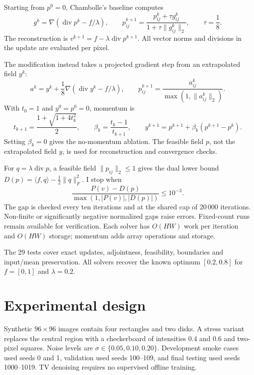 \documentclass[10pt,a4paper]{article}
\begin{document}
Starting from $p^0=0$, Chambolle's baseline computes
\begin{equation}
 g^k=\nabla\!\left(\operatorname{div}p^k-f/\lambda\right),
 \qquad
 p^{k+1}_{ij}=
 \frac{p^k_{ij}+\tau g^k_{ij}}
      {1+\tau\|g^k_{ij}\|_2},
 \qquad \tau=\frac18.
 \label{eq:baseline}
\end{equation}
The reconstruction is $v^{k+1}=f-\lambda\operatorname{div}p^{k+1}$.
All vector norms and divisions in the update are evaluated per pixel.

The modification instead takes a projected gradient step from an
extrapolated field $y^k$:
\begin{equation}
 a^k=y^k+\frac18\nabla\!\left(\operatorname{div}y^k-f/\lambda\right),
 \qquad
 p^{k+1}_{ij}=\frac{a^k_{ij}}{\max(1,\|a^k_{ij}\|_2)}.
 \label{eq:projection}
\end{equation}
With $t_0=1$ and $y^0=p^0=0$, momentum is
\begin{equation}
 t_{k+1}=\frac{1+\sqrt{1+4t_k^2}}2,\qquad
 \beta_k=\frac{t_k-1}{t_{k+1}},\qquad
 y^{k+1}=p^{k+1}+\beta_k(p^{k+1}-p^k).
\end{equation}
Setting $\beta_k=0$ gives the no-momentum ablation.
The feasible field $p$, not the extrapolated field $y$, is used for
reconstruction and convergence checks.

For $q=\lambda\operatorname{div}p$, a feasible field
$\|p_{ij}\|_2\leq1$ gives the dual lower bound
$D(p)=\langle f,q\rangle-\frac12\|q\|_F^2$.
I stop when
\begin{equation}
 \frac{P(v)-D(p)}{\max(1,|P(v)|,|D(p)|)}\leq10^{-3}.
 \label{eq:gap}
\end{equation}
The gap is checked every ten iterations and at the shared cap of
20\,000 iterations. Non-finite or significantly negative normalized
gaps raise errors. Fixed-count runs remain available for verification.
Each solver has $O(HW)$ work per iteration and $O(HW)$ storage;
momentum adds array operations and storage.

The 29 tests cover exact updates, adjointness, feasibility, boundaries
and input/mean preservation. All solvers recover the known optimum
$[0.2,0.8]$ for $f=[0,1]$ and $\lambda=0.2$.

\newpage

\section{Experimental design}

Synthetic $96\times96$ images contain four rectangles and two disks.
A stress variant replaces the central region with a checkerboard of
intensities 0.4 and 0.6 and two-pixel squares. Noise levels are
$\sigma\in\{0.05,0.10,0.20\}$.
Development smoke cases used seeds 0 and 1, validation used seeds
100--109, and final testing used seeds 1000--1019.
TV denoising requires no supervised offline training.
\end{document}
